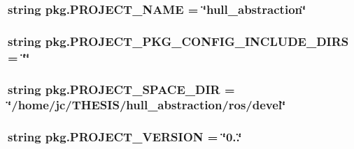 \subsubsection[{\texorpdfstring{P\+R\+O\+J\+E\+C\+T\+\_\+\+N\+A\+ME}{PROJECT_NAME}}]{\setlength{\rightskip}{0pt plus 5cm}string pkg.\+P\+R\+O\+J\+E\+C\+T\+\_\+\+N\+A\+ME = \char`\"{}hull\+\_\+abstraction\char`\"{}}\hypertarget{namespacepkg_a7dfbe99257c26f5e4a3a5483995d9ddc}{}\label{namespacepkg_a7dfbe99257c26f5e4a3a5483995d9ddc}
\subsubsection[{\texorpdfstring{P\+R\+O\+J\+E\+C\+T\+\_\+\+P\+K\+G\+\_\+\+C\+O\+N\+F\+I\+G\+\_\+\+I\+N\+C\+L\+U\+D\+E\+\_\+\+D\+I\+RS}{PROJECT_PKG_CONFIG_INCLUDE_DIRS}}]{\setlength{\rightskip}{0pt plus 5cm}string pkg.\+P\+R\+O\+J\+E\+C\+T\+\_\+\+P\+K\+G\+\_\+\+C\+O\+N\+F\+I\+G\+\_\+\+I\+N\+C\+L\+U\+D\+E\+\_\+\+D\+I\+RS = \char`\"{}\char`\"{}}\hypertarget{namespacepkg_a2760bf8266ff58da440f65ee91b203ab}{}\label{namespacepkg_a2760bf8266ff58da440f65ee91b203ab}
\subsubsection[{\texorpdfstring{P\+R\+O\+J\+E\+C\+T\+\_\+\+S\+P\+A\+C\+E\+\_\+\+D\+IR}{PROJECT_SPACE_DIR}}]{\setlength{\rightskip}{0pt plus 5cm}string pkg.\+P\+R\+O\+J\+E\+C\+T\+\_\+\+S\+P\+A\+C\+E\+\_\+\+D\+IR = \char`\"{}/home/jc/T\+H\+E\+S\+IS/hull\+\_\+abstraction/ros/devel\char`\"{}}\hypertarget{namespacepkg_a3f0f1b4bc03c596525e025539ca4332f}{}\label{namespacepkg_a3f0f1b4bc03c596525e025539ca4332f}
\subsubsection[{\texorpdfstring{P\+R\+O\+J\+E\+C\+T\+\_\+\+V\+E\+R\+S\+I\+ON}{PROJECT_VERSION}}]{\setlength{\rightskip}{0pt plus 5cm}string pkg.\+P\+R\+O\+J\+E\+C\+T\+\_\+\+V\+E\+R\+S\+I\+ON = \char`\"{}0..\char`\"{}}\hypertarget{namespacepkg_ab1037914b9286bb61855131c06149648}{}\label{namespacepkg_ab1037914b9286bb61855131c06149648}

